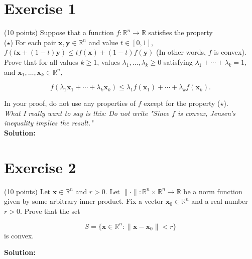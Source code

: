 \documentclass{article}
\begin{document}
\section{Exercise 1}
(10 points) Suppose that a function $f: \mathbb{R}^n \to \mathbb{R}$ satisfies the property \\

($\star$) For each pair $\mathbf{x}, \mathbf{y} \in \mathbb{R}^n$ and value $t \in [0,1]$, $f(t\mathbf{x} + (1-t)\mathbf{y}) \leq tf(\mathbf{x}) + (1-t)f(\mathbf{y})$ (In other words, $f$ is convex). \\

Prove that for all values $k \geq 1$, values $\lambda_1,\ldots,\lambda_k \geq 0$ satisfying $\lambda_1 + \cdots + \lambda_k = 1$, and $\mathbf{x}_1,\ldots,\mathbf{x}_k \in \mathbb{R}^n$,

$$f(\lambda_1\mathbf{x}_1 + \cdots + \lambda_k\mathbf{x}_k) \leq \lambda_1f(\mathbf{x}_1) + \cdots + \lambda_kf(\mathbf{x}_k).$$

In your proof, do not use any properties of $f$ except for the property ($\star$). \\

\textit{What I really want to say is this: Do not write "Since $f$ is convex, Jensen's inequality implies the result."} \\

\textbf{Solution: } \\



\newpage

\section{Exercise 2}
(10 points) Let $\mathbf{x} \in \mathbb{R}^n$ and $r > 0$. Let $\|\cdot\|: \mathbb{R}^n \times \mathbb{R}^n \to \mathbb{R}$ be a norm function given by some arbitrary inner product. Fix a vector $\mathbf{x}_0 \in \mathbb{R}^n$ and a real number $r > 0$. Prove that the set

$$S = \{\mathbf{x} \in \mathbb{R}^n : \|\mathbf{x} - \mathbf{x}_0\| < r\}$$
is convex.

\textbf{Solution: } \\



\newpage
\end{document}
